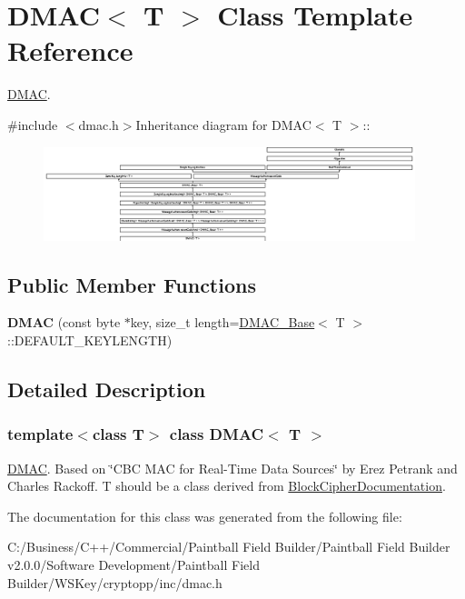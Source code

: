 \hypertarget{class_d_m_a_c}{
\section{DMAC$<$ T $>$ Class Template Reference}
\label{class_d_m_a_c}
}


\hyperlink{class_d_m_a_c}{DMAC}.  


{\ttfamily \#include $<$dmac.h$>$}Inheritance diagram for DMAC$<$ T $>$::\begin{figure}[H]
\begin{center}
\leavevmode
\includegraphics[height=2.72687cm]{class_d_m_a_c}
\end{center}
\end{figure}
\subsection*{Public Member Functions}
\begin{DoxyCompactItemize}
\item 
\hypertarget{class_d_m_a_c_a52fac17929c02766ec6d75b2d1bf6521}{
{\bfseries DMAC} (const byte $\ast$key, size\_\-t length=\hyperlink{class_d_m_a_c___base}{DMAC\_\-Base}$<$ T $>$::DEFAULT\_\-KEYLENGTH)}
\label{class_d_m_a_c_a52fac17929c02766ec6d75b2d1bf6521}

\end{DoxyCompactItemize}


\subsection{Detailed Description}
\subsubsection*{template$<$class T$>$ class DMAC$<$ T $>$}

\hyperlink{class_d_m_a_c}{DMAC}. Based on \char`\"{}CBC MAC for Real-\/Time Data Sources\char`\"{} by Erez Petrank and Charles Rackoff. T should be a class derived from \hyperlink{struct_block_cipher_documentation}{BlockCipherDocumentation}. 

The documentation for this class was generated from the following file:\begin{DoxyCompactItemize}
\item 
C:/Business/C++/Commercial/Paintball Field Builder/Paintball Field Builder v2.0.0/Software Development/Paintball Field Builder/WSKey/cryptopp/inc/dmac.h\end{DoxyCompactItemize}
